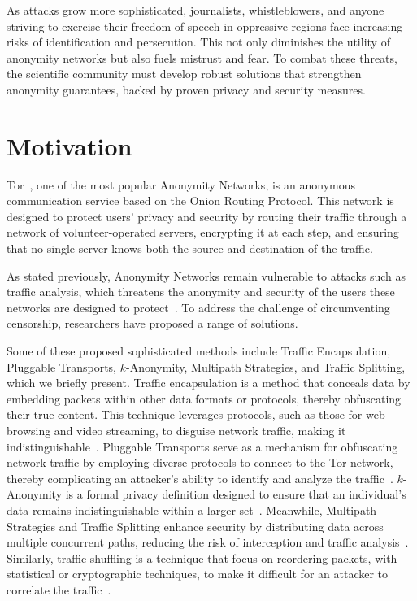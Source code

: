 As attacks grow more sophisticated, journalists, whistleblowers, and anyone striving to exercise their freedom of speech in oppressive regions face increasing risks of identification and persecution. This not only diminishes the utility of anonymity networks but also fuels mistrust and fear. To combat these threats, the scientific community must develop robust solutions that strengthen anonymity guarantees, backed by proven privacy and security measures.


\section{Motivation}\label{sec:motivation}

Tor~\cite{dingledine2004tor}, one of the most popular Anonymity Networks, is an anonymous communication service based on the Onion Routing Protocol. This network is designed to protect users' privacy and security by routing their traffic through a network of volunteer-operated servers, encrypting it at each step, and ensuring that no single server knows both the source and destination of the traffic.

As stated previously, Anonymity Networks remain vulnerable to attacks such as traffic analysis, which threatens the anonymity and security of the users these networks are designed to protect~\cite*{chakravarty2014trafficanalysis, winter2012great, robjansen2019dosontor, StatDisclosure, PracticalStatDisclosure, DeepFingerprinting, TikTok, OnlineWebFingerprinting, TrafficAnalysisLowMixnet, AnalysisMixNetsYeZhu}. To address the challenge of circumventing censorship, researchers have proposed a range of solutions. 

Some of these proposed sophisticated methods include Traffic Encapsulation, Pluggable Transports, \(k\)-Anonymity, Multipath Strategies, and Traffic Splitting, which we briefly present. Traffic encapsulation is a method that conceals data by embedding packets within other data formats or protocols, thereby obfuscating their true content. This technique leverages protocols, such as those for web browsing and video streaming, to disguise network traffic, making it indistinguishable~\cite*{TorKameleon, MIRACE, StegoTorus, Protozoa, Stegozoa, Freewave}. Pluggable Transports serve as a mechanism for obfuscating network traffic by employing diverse protocols to connect to the Tor network, thereby complicating an attacker's ability to identify and analyze the traffic~\cite*{PlugTrans,Circumvention,TorKameleon}. \(k\)-Anonymity is a formal privacy definition designed to ensure that an individual's data remains indistinguishable within a larger set~\cite*{DP_Book,KAnonSweeney,kAnonymityEffectiveness}. Meanwhile, Multipath Strategies and Traffic Splitting enhance security by distributing data across multiple concurrent paths, reducing the risk of interception and traffic analysis~\cite*{TorKameleon,MIRACE,Loopix,Wang_2022}. Similarly, traffic shuffling is a technique that focus on reordering packets, with statistical or cryptographic techniques, to make it difficult for an attacker to correlate the traffic~\cite*{DAENet, Karaoke, Riposte, Loopix, Dissent}. 

